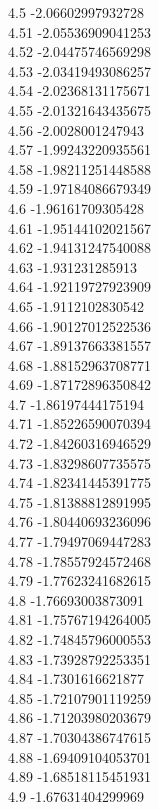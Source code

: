 {4.5	-2.06602997932728\\
4.51	-2.05536909041253\\
4.52	-2.04475746569298\\
4.53	-2.03419493086257\\
4.54	-2.02368131175671\\
4.55	-2.01321643435675\\
4.56	-2.0028001247943\\
4.57	-1.99243220935561\\
4.58	-1.98211251448588\\
4.59	-1.97184086679349\\
4.6	-1.96161709305428\\
4.61	-1.95144102021567\\
4.62	-1.94131247540088\\
4.63	-1.931231285913\\
4.64	-1.92119727923909\\
4.65	-1.9112102830542\\
4.66	-1.90127012522536\\
4.67	-1.89137663381557\\
4.68	-1.88152963708771\\
4.69	-1.87172896350842\\
4.7	-1.86197444175194\\
4.71	-1.85226590070394\\
4.72	-1.84260316946529\\
4.73	-1.83298607735575\\
4.74	-1.82341445391775\\
4.75	-1.81388812891995\\
4.76	-1.80440693236096\\
4.77	-1.79497069447283\\
4.78	-1.78557924572468\\
4.79	-1.77623241682615\\
4.8	-1.76693003873091\\
4.81	-1.75767194264005\\
4.82	-1.74845796000553\\
4.83	-1.73928792253351\\
4.84	-1.7301616621877\\
4.85	-1.72107901119259\\
4.86	-1.71203980203679\\
4.87	-1.70304386747615\\
4.88	-1.69409104053701\\
4.89	-1.68518115451931\\
4.9	-1.67631404299969\\
}
